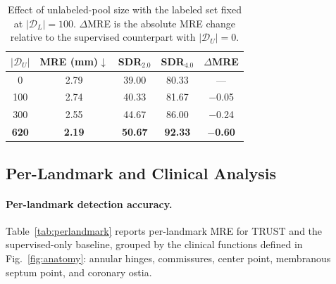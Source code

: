 \documentclass[conference]{IEEEtran}
\begin{document}
\begin{table}[t]
\centering
\caption{Effect of unlabeled-pool size with the labeled set fixed at $|\mathcal{D}_L|=100$. $\Delta$MRE is the absolute MRE change relative to the supervised counterpart with $|\mathcal{D}_U|=0$.}
\label{tab:unlabeled_pool}
\setlength{\tabcolsep}{5pt}
\footnotesize
\begin{tabular}{c c c c c}
\toprule
$|\mathcal{D}_U|$ & MRE (mm)$\downarrow$ & \scriptsize SDR$_{2.0}$ & \scriptsize SDR$_{4.0}$ & $\Delta$MRE \\
\midrule
0   & 2.79 & 39.00 & 80.33 & --- \\
100 & 2.74 & 40.33 & 81.67 & $-$0.05 \\
300 & 2.55 & 44.67 & 86.00 & $-$0.24 \\
\textbf{620} & \textbf{2.19} & \textbf{50.67} & \textbf{92.33} & \textbf{$-$0.60} \\
\bottomrule
\end{tabular}
\end{table}

\subsection{Per-Landmark and Clinical Analysis}
\label{sec:perlandmark}

\paragraph{Per-landmark detection accuracy.}
Table~\ref{tab:perlandmark} reports per-landmark MRE for TRUST and the supervised-only baseline, grouped by the clinical functions defined in Fig.~\ref{fig:anatomy}: annular hinges, commissures, center point, membranous septum point, and coronary ostia.
\end{document}
